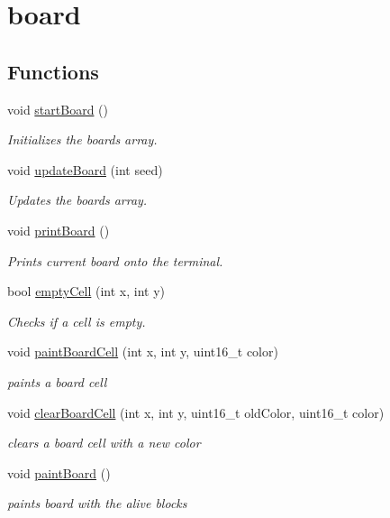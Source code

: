 \hypertarget{group__board}{}\section{board}
\label{group__board}
\subsection*{Functions}
\begin{DoxyCompactItemize}
\item 
void \mbox{\hyperlink{group__board_ga978d4c9242b0a08ccba7244855a6fd34}{start\+Board}} ()
\begin{DoxyCompactList}\small\item\em Initializes the board\textquotesingle{}s array. \end{DoxyCompactList}\item 
void \mbox{\hyperlink{group__board_ga8cfe09094cdbdece93ee59c05c3c9375}{update\+Board}} (int seed)
\begin{DoxyCompactList}\small\item\em Updates the board\textquotesingle{}s array. \end{DoxyCompactList}\item 
void \mbox{\hyperlink{group__board_ga8310d6d1e915cb179f834d9ca017950a}{print\+Board}} ()
\begin{DoxyCompactList}\small\item\em Prints current board onto the terminal. \end{DoxyCompactList}\item 
bool \mbox{\hyperlink{group__board_gac7217ffded731ca5e0785e35b36c0191}{empty\+Cell}} (int x, int y)
\begin{DoxyCompactList}\small\item\em Checks if a cell is empty. \end{DoxyCompactList}\item 
void \mbox{\hyperlink{group__board_gaca3eaa2f0cd1abf2f8cb0e6d80f0048f}{paint\+Board\+Cell}} (int x, int y, uint16\+\_\+t color)
\begin{DoxyCompactList}\small\item\em paints a board cell \end{DoxyCompactList}\item 
void \mbox{\hyperlink{group__board_ga5559e08677901d82c4ad934914c0b9dc}{clear\+Board\+Cell}} (int x, int y, uint16\+\_\+t old\+Color, uint16\+\_\+t color)
\begin{DoxyCompactList}\small\item\em clears a board cell with a new color \end{DoxyCompactList}\item 
void \mbox{\hyperlink{group__board_ga7f29585bdde7d843e71f9f2c80c8543a}{paint\+Board}} ()
\begin{DoxyCompactList}\small\item\em paints board with the alive blocks \end{DoxyCompactList}\end{DoxyCompactItemize}
